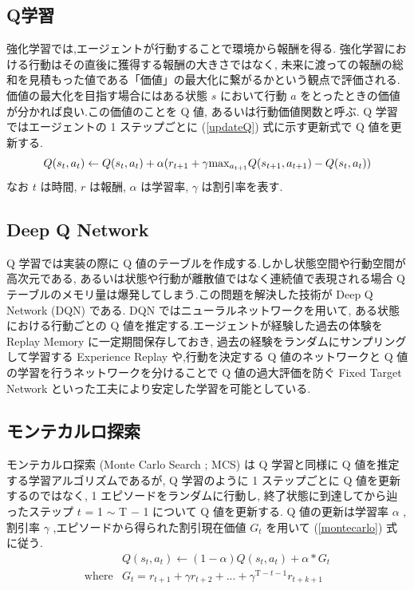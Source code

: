 \documentclass[twocolumn]{jarticle}     %
\begin{document}
\subsection{Q学習}
強化学習では,エージェントが行動することで環境から報酬を得る. 強化学習における行動はその直後に獲得する報酬の大きさではなく, 未来に渡っての報酬の総和を見積もった値である「価値」の最大化に繋がるかという観点で評価される.
価値の最大化を目指す場合にはある状態 $s$ において行動 $a$ をとったときの価値が分かれば良い.この価値のことを Q 値, あるいは行動価値関数と呼ぶ.
 Q 学習ではエージェントの 1 ステップごとに (\ref{updateQ}) 式に示す更新式で Q 値を更新する.
\begin{equation}
  \small
  \label{updateQ}
  Q(s_t,a_t) \leftarrow  Q(s_t,a_t) + \alpha(r_{t+1} + \gamma \mathrm{max}_{a_{t+1}}Q(s_{t+1},a_{t+1}) - Q(s_t,a_t))
\end{equation}
なお $t$ は時間, $r$ は報酬, $\alpha$ は学習率, $\gamma$ は割引率を表す.

\subsection{Deep Q Network}
Q 学習では実装の際に Q 値のテーブルを作成する.しかし状態空間や行動空間が高次元である, あるいは状態や行動が離散値ではなく連続値で表現される場合 Q テーブルのメモリ量は爆発してしまう.この問題を解決した技術が Deep Q Network (DQN) である.
 DQN ではニューラルネットワークを用いて, ある状態における行動ごとの Q 値を推定する.エージェントが経験した過去の体験を Replay Memory に一定期間保存しておき, 過去の経験をランダムにサンプリングして学習する Experience Replay や,行動を決定する Q 値のネットワークと Q 値の学習を行うネットワークを分けることで Q 値の過大評価を防ぐ Fixed Target Network といった工夫により安定した学習を可能としている\cite{DQN}.

\subsection{モンテカルロ探索}
モンテカルロ探索 (Monte Carlo Search ; MCS) は Q 学習と同様に Q 値を推定する学習アルゴリズムであるが, Q 学習のように 1 ステップごとに Q 値を更新するのではなく, 1 エピソードをランダムに行動し, 終了状態に到達してから辿ったステップ $t$ = 1 $\sim$ T $-$ 1 について Q 値を更新する. Q 値の更新は学習率 $\alpha$ , 割引率 $\gamma$ ,エピソードから得られた割引現在価値 $G_t$ を用いて (\ref{montecarlo}) 式に従う.
\begin{eqnarray}
  \label{montecarlo}
  &Q(s_t,a_t) \leftarrow (1 - \alpha)Q(s_t,a_t) + \alpha * G_{t} \\
  \mathrm{where}  &G_t = r_{t+1} + \gamma r_{t+2} + ... + \gamma^{\mathrm{T}-t-1} r_{t+k+1} \nonumber
\end{eqnarray}
\end{document}
